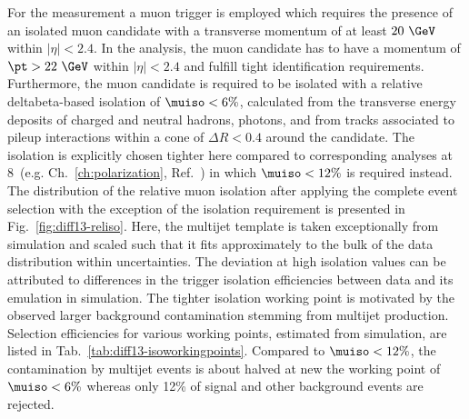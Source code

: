 For the measurement a muon trigger is employed which requires the presence of an isolated muon candidate with a transverse momentum of at least $20~\GeV$ within $|\eta|<2.4$. In the analysis, the muon candidate has to have a momentum of $\pt>22~\GeV$ within $|\eta|<2.4$ and fulfill tight identification requirements. Furthermore, the muon candidate is required to be isolated with a relative \gls{deltabeta}-based isolation of $\muiso<6\%$, calculated from the transverse energy deposits of charged and neutral hadrons, photons, and from tracks associated to pileup interactions within a cone of $\Delta R<0.4$ around the candidate. The isolation is explicitly chosen tighter here compared to corresponding analyses at 8~\TeV (e.g. Ch.~\ref{ch:polarization}, Ref.~\cite{Khachatryan:2014iya}) in which $\muiso<12\%$ is required instead. The distribution of the relative muon isolation after applying the complete event selection with the exception of the isolation requirement is presented in Fig.~\ref{fig:diff13-reliso}. Here, the multijet template is taken exceptionally from simulation and scaled such that it fits approximately to the bulk of the data distribution within uncertainties. The deviation at high isolation values can be attributed to differences in the trigger isolation efficiencies between data and its emulation in simulation. The tighter isolation working point is motivated by the observed larger background contamination stemming from multijet production. Selection efficiencies for various working points, estimated from simulation, are listed in Tab.~\ref{tab:diff13-isoworkingpoints}. Compared to $\muiso<12\%$, the contamination by multijet events is about halved at new the working point of $\muiso<6\%$ whereas only 12\% of signal and other background events are rejected.



